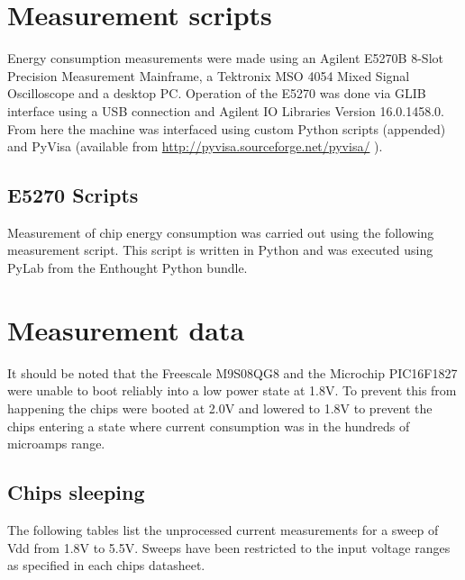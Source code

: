 
\label{Appendix:Measurements}


\section{Measurement scripts}

Energy consumption measurements were made using an Agilent E5270B
8-Slot Precision Measurement Mainframe, a Tektronix MSO 4054 Mixed
Signal Oscilloscope and a desktop PC. Operation of the E5270 was done
via GLIB interface using a USB connection and Agilent IO Libraries
Version 16.0.1458.0. From here the machine was interfaced using custom
Python scripts (appended) and PyVisa (available from \url{http://pyvisa.sourceforge.net/pyvisa/} ).

\subsection{E5270 Scripts}

Measurement of chip energy consumption was carried out using the following
measurement script. This script is written in Python and was executed
using PyLab from the Enthought Python bundle.




\section{Measurement data}

It should be noted that the Freescale M9S08QG8 and the Microchip PIC16F1827
were unable to boot reliably into a low power state at 1.8V. To prevent
this from happening the chips were booted at 2.0V and lowered to 1.8V
to prevent the chips entering a state where current consumption was
in the hundreds of microamps range.


\subsection{Chips sleeping}

The following tables list the unprocessed current measurements for
a sweep of Vdd from 1.8V to 5.5V. Sweeps have been restricted to the
input voltage ranges as specified in each chips datasheet.

